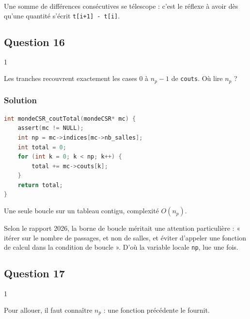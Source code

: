 \documentclass[11pt,a4paper]{article}
\begin{document}
\begin{methode}

Une somme de différences consécutives se télescope : c'est le réflexe à avoir dès qu'une quantité s'écrit \texttt{t{[}i+1{]}\ -\ t{[}i{]}}.

\end{methode}

\hypertarget{question-16}{%
\subsection{Question 16}\label{question-16}}

\begin{indication}{1}

Les tranches recouvrent exactement les cases \(0\) à \(n_p - 1\) de \texttt{couts}. Où lire \(n_p\) ?

\end{indication}

\hypertarget{solution-15}{%
\subsubsection{Solution}\label{solution-15}}

\begin{lstlisting}[language=C]
int mondeCSR_coutTotal(mondeCSR* mc) {
    assert(mc != NULL);
    int np = mc->indices[mc->nb_salles];
    int total = 0;
    for (int k = 0; k < np; k++) {
        total += mc->couts[k];
    }
    return total;
}
\end{lstlisting}

Une seule boucle sur un tableau contigu, complexité \(O(n_p)\).

\begin{jury}

Selon le rapport 2026, la borne de boucle méritait une attention particulière : « itérer sur le nombre de passages, et non de salles, et éviter d'appeler une fonction de calcul dans la condition de boucle ». D'où la variable locale \texttt{np}, lue une fois.

\end{jury}

\hypertarget{question-17}{%
\subsection{Question 17}\label{question-17}}

\begin{indication}{1}

Pour allouer, il faut connaître \(n_p\) : une fonction précédente le fournit.

\end{indication}
\end{document}

